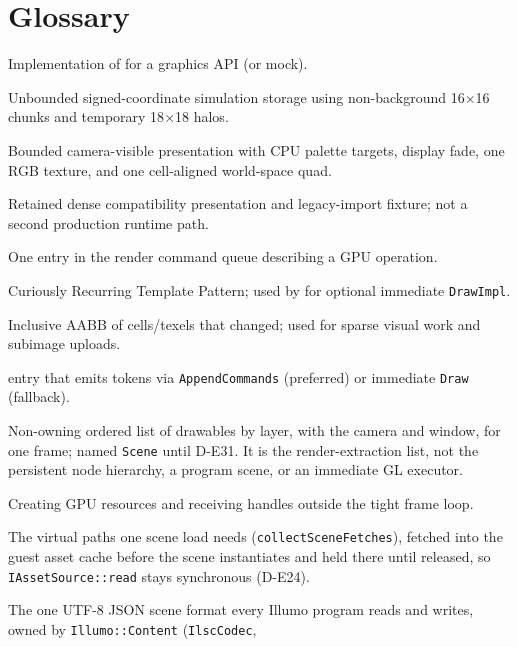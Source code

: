 \section{Glossary}
\label{sec:glossary}

\begin{description}[style=nextline, leftmargin=0pt]
  \item[Backend]
    Implementation of  for a graphics API (or mock).
  \item[SparseCellGrid]
    Unbounded signed-coordinate simulation storage using non-background
    16$\times$16 chunks and temporary 18$\times$18 halos.
  \item[CanvasView]
    Bounded camera-visible presentation with CPU palette targets, display fade,
    one RGB texture, and one cell-aligned world-space quad.
  \item[Canvas]
    Retained dense compatibility presentation and legacy-import fixture; not a
    second production runtime path.
  \item[Command / token]
    One entry in the render command queue describing a GPU operation.
  \item[CRTP]
    Curiously Recurring Template Pattern; used by  for
    optional immediate \texttt{DrawImpl}.
  \item[Dirty rect]
    Inclusive AABB of cells/texels that changed; used for sparse visual work
    and subimage uploads.
  \item[Drawable]
     entry that emits tokens via \texttt{AppendCommands}
    (preferred) or immediate \texttt{Draw} (fallback).
  \item[DrawList]
    Non-owning ordered list of drawables by layer, with the camera and window,
    for one frame; named \texttt{Scene} until D-E31. It is the
    render-extraction list, not the persistent node hierarchy, a program
    scene, or an immediate GL executor.
  \item[Enrollment]
    Creating GPU resources and receiving handles outside the tight frame loop.
  \item[Fetch set]
    The virtual paths one scene load needs (\texttt{collectSceneFetches}),
    fetched into the guest asset cache before the scene instantiates and held
    there until released, so \texttt{IAssetSource::read} stays synchronous
    (D-E24).
  \item[.ilsc format 2]
    The one UTF-8 JSON scene format every Illumo program reads and writes,
    owned by \texttt{Illumo::Content} (\texttt{IlscCodec},

\end{description}
